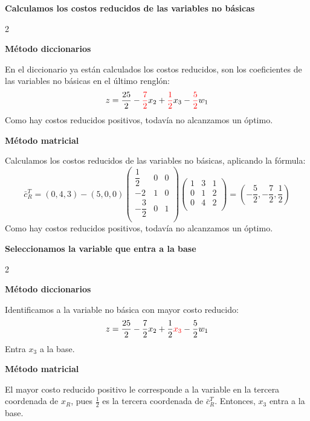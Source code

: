 \documentclass{article}
\begin{document}
    \begin{center}
        \textbf{Calculamos los costos reducidos de las variables no básicas}
    \end{center}
    \begin{multicols}{2}
        \raggedcolumns
        \begin{center}
            \textbf{Método diccionarios}
        \end{center}

        En el diccionario ya están calculados los costos reducidos, son los coeficientes de las variables no básicas
        en el último renglón:
        \[z    =  \dfrac{25}{2}  -  {\color{red}\dfrac{7}{2}}x_2  +  {\color{red}\dfrac{1}{2}}x_3  -
            {\color{red}\dfrac{5}{2}}w_1\]
        Como hay costos reducidos positivos, todavía no alcanzamos un óptimo.
        \columnbreak
        \begin{center}
            \textbf{Método matricial}
        \end{center}
        Calculamos los costos reducidos de las variables no básicas, aplicando la fórmula:
        \[\bar{c}_R^T =
        (0,4,3) - (5,0,0)
        \begin{pmatrix}
                \dfrac{1}{2} & 0 & 0 \\
                -2 & 1 & 0 \\
                -\dfrac{3}{2} & 0 & 1 \\
        \end{pmatrix}
        \begin{pmatrix}
                1 & 3 & 1 \\
                0 & 1 & 2 \\
                0 & 4 & 2 \\
        \end{pmatrix} = \left(-\dfrac{5}{2}, -\dfrac{7}{2}, \dfrac{1}{2}\right)
        \]
        Como hay costos reducidos positivos, todavía no alcanzamos un óptimo.
    \end{multicols}

    \begin{center}
        \textbf{Seleccionamos la variable que entra a la base}
    \end{center}
    \begin{multicols}{2}
        \raggedcolumns
        \begin{center}
            \textbf{Método diccionarios}
        \end{center}

        Identificamos a la variable no básica con mayor costo reducido:
        \[z    =  \dfrac{25}{2}  -  \dfrac{7}{2}x_2  +  \dfrac{1}{2}{\color{red}x_3}  -
            \dfrac{5}{2}w_1\]
        Entra $x_3$ a la base.
        \columnbreak
        \begin{center}
            \textbf{Método matricial}
        \end{center}

        El mayor costo reducido positivo le corresponde a la variable en la tercera coordenada de $x_R$, pues
        $\frac{1}{2}$ es la tercera coordenada de $\bar{c}_R^T$.
        Entonces, $x_3$ entra a la base.
    \end{multicols}
\end{document}
